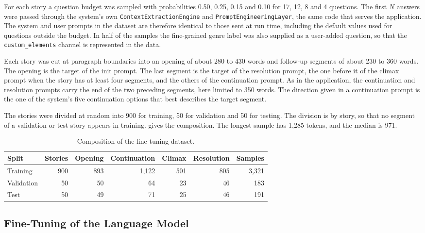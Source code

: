 For each story a question budget was sampled with probabilities 0.50, 0.25, 0.15 and 0.10 for 17, 12, 8 and 4 questions. The first $N$ answers were passed through the system's own \texttt{ContextExtractionEngine} and \texttt{PromptEngineeringLayer}, the same code that serves the application. The system and user prompts in the dataset are therefore identical to those sent at run time, including the default values used for questions outside the budget. In half of the samples the fine-grained genre label was also supplied as a user-added question, so that the \texttt{custom\_elements} channel is represented in the data.

Each story was cut at paragraph boundaries into an opening of about 280 to 430 words and follow-up segments of about 230 to 360 words. The opening is the target of the init prompt. The last segment is the target of the resolution prompt, the one before it of the climax prompt when the story has at least four segments, and the others of the continuation prompt. As in the application, the continuation and resolution prompts carry the end of the two preceding segments, here limited to 350 words. The direction given in a continuation prompt is the one of the system's five continuation options that best describes the target segment.

The stories were divided at random into 900 for training, 50 for validation and 50 for testing. The division is by story, so that no segment of a validation or test story appears in training.  gives the composition. The longest sample has 1,285 tokens, and the median is 971.

\begin{table}[H]
\centering
\caption{Composition of the fine-tuning dataset.}
\label{tab:dataset}
\renewcommand{\arraystretch}{1.2}
\begin{tabular}{@{}lrrrrrr@{}}
\toprule
\textbf{Split} & \textbf{Stories} & \textbf{Opening} & \textbf{Continuation} & \textbf{Climax} & \textbf{Resolution} & \textbf{Samples} \\
\midrule
Training   & 900 & 893 & 1,122 & 501 & 805 & 3,321 \\
Validation & 50  & 50  & 64    & 23  & 46  & 183 \\
Test       & 50  & 49  & 71    & 25  & 46  & 191 \\
\bottomrule
\end{tabular}
\end{table}

\subsection{Fine-Tuning of the Language Model}
\label{sec:model-finetune}

